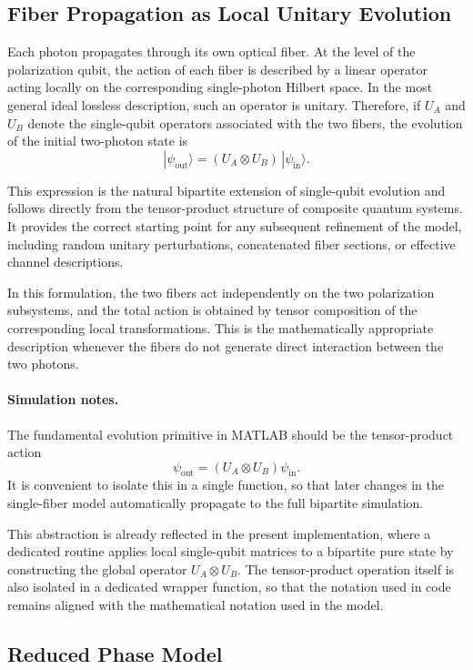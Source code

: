 \documentclass[a4paper]{article}
\begin{document}
\subsection{Fiber Propagation as Local Unitary Evolution}

Each photon propagates through its own optical fiber. At the level of the polarization qubit, the action of each fiber is described by a linear operator acting locally on the corresponding single-photon Hilbert space. In the most general ideal lossless description, such an operator is unitary. Therefore, if \(U_A\) and \(U_B\) denote the single-qubit operators associated with the two fibers, the evolution of the initial two-photon state is
\[
|\psi_{\mathrm{out}}\rangle
=
(U_A \otimes U_B)\, |\psi_{\mathrm{in}}\rangle.
\]

This expression is the natural bipartite extension of single-qubit evolution and follows directly from the tensor-product structure of composite quantum systems. It provides the correct starting point for any subsequent refinement of the model, including random unitary perturbations, concatenated fiber sections, or effective channel descriptions.

In this formulation, the two fibers act independently on the two polarization subsystems, and the total action is obtained by tensor composition of the corresponding local transformations. This is the mathematically appropriate description whenever the fibers do not generate direct interaction between the two photons.

\paragraph{Simulation notes.}
The fundamental evolution primitive in MATLAB should be the tensor-product action
\[
\psi_{\mathrm{out}} = (U_A \otimes U_B)\psi_{\mathrm{in}}.
\]
It is convenient to isolate this in a single function, so that later changes in the single-fiber model automatically propagate to the full bipartite simulation.

This abstraction is already reflected in the present implementation, where a dedicated routine applies local single-qubit matrices to a bipartite pure state by constructing the global operator \(U_A \otimes U_B\). The tensor-product operation itself is also isolated in a dedicated wrapper function, so that the notation used in code remains aligned with the mathematical notation used in the model.

\subsection{Reduced Phase Model}
\end{document}
